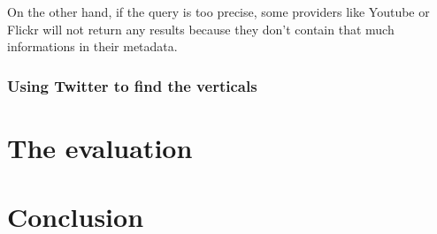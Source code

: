 \documentclass[10pt, a4paper]{article}
\begin{document}
On the other hand, if the query is too precise, some providers like Youtube or Flickr will not return any results because they don't contain that much informations in their metadata.

\subsubsection{Using Twitter to find the verticals}


\section{The evaluation}



\section{Conclusion}


%
%
\end{document}
